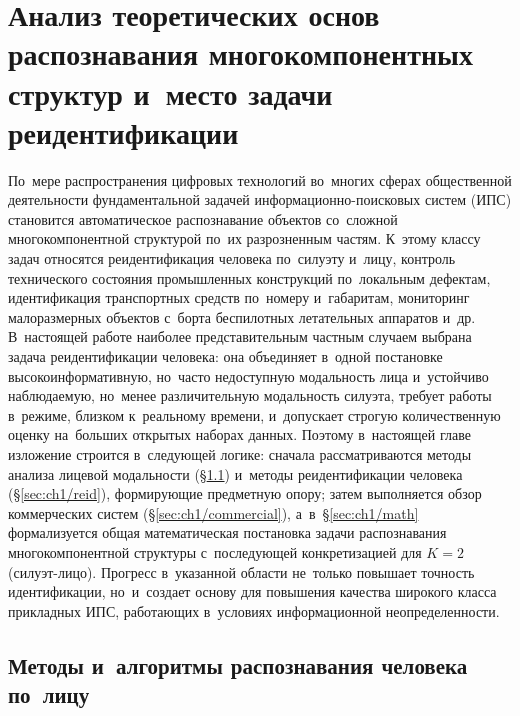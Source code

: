 \chapter{Анализ теоретических основ распознавания многокомпонентных структур и~место задачи реидентификации}\label{ch:ch1}

По~мере распространения цифровых технологий во~многих сферах общественной деятельности фундаментальной задачей информационно-поисковых систем
(ИПС) становится автоматическое распознавание объектов со~сложной
многокомпонентной структурой по~их разрозненным частям. К~этому классу
задач относятся реидентификация человека по~силуэту и~лицу, контроль
технического состояния промышленных конструкций по~локальным дефектам,
идентификация транспортных средств по~номеру и~габаритам, мониторинг
малоразмерных объектов с~борта беспилотных летательных аппаратов и~др.
В~настоящей работе наиболее представительным частным случаем выбрана
задача реидентификации человека: она объединяет в~одной постановке
высокоинформативную, но~часто недоступную модальность лица и~устойчиво
наблюдаемую, но~менее различительную модальность силуэта, требует работы
в~режиме, близком к~реальному времени, и~допускает строгую количественную
оценку на~больших открытых наборах данных. Поэтому в~настоящей главе
изложение строится в~следующей логике: сначала рассматриваются методы
анализа лицевой модальности (\S\ref{sec:ch1/face}) и~методы реидентификации
человека (\S\ref{sec:ch1/reid}), формирующие предметную опору; затем
выполняется обзор коммерческих систем (\S\ref{sec:ch1/commercial}),
а~в~\S\ref{sec:ch1/math} формализуется общая математическая
постановка задачи распознавания многокомпонентной структуры
с~последующей конкретизацией для $K=2$ (силуэт-лицо). Прогресс в~указанной
области не~только повышает точность идентификации, но~и~создает
основу для повышения качества широкого класса прикладных ИПС, работающих
в~условиях информационной неопределенности.

\section{Методы и~алгоритмы распознавания человека по~лицу}\label{sec:ch1/face}

